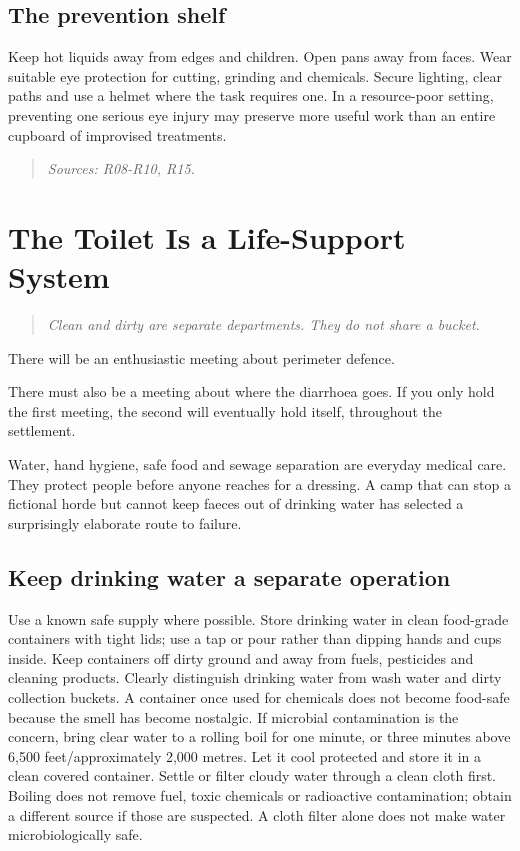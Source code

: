 \documentclass[10pt,openright]{book}
\begin{document}
\section*{The prevention shelf}
Keep hot liquids away from edges and children. Open pans away from faces. Wear suitable eye protection for cutting, grinding and chemicals. Secure lighting, clear paths and use a helmet where the task requires one. In a resource-poor setting, preventing one serious eye injury may preserve more useful work than an entire cupboard of improvised treatments.

\begin{quote}\emph{Sources: R08-R10, R15.}\end{quote}

\chapter{The Toilet Is a Life-Support System}
\begin{quote}\emph{Clean and dirty are separate departments. They do not share a bucket.}\end{quote}
There will be an enthusiastic meeting about perimeter defence.

There must also be a meeting about where the diarrhoea goes. If you only hold the first meeting, the second will eventually hold itself, throughout the settlement.

Water, hand hygiene, safe food and sewage separation are everyday medical care. They protect people before anyone reaches for a dressing. A camp that can stop a fictional horde but cannot keep faeces out of drinking water has selected a surprisingly elaborate route to failure.

\section*{Keep drinking water a separate operation}
Use a known safe supply where possible. Store drinking water in clean food-grade containers with tight lids; use a tap or pour rather than dipping hands and cups inside. Keep containers off dirty ground and away from fuels, pesticides and cleaning products. Clearly distinguish drinking water from wash water and dirty collection buckets. A container once used for chemicals does not become food-safe because the smell has become nostalgic. If microbial contamination is the concern, bring clear water to a rolling boil for one minute, or three minutes above 6,500 feet/approximately 2,000 metres. Let it cool protected and store it in a clean covered container. Settle or filter cloudy water through a clean cloth first. Boiling does not remove fuel, toxic chemicals or radioactive contamination; obtain a different source if those are suspected. A cloth filter alone does not make water microbiologically safe.
\end{document}

